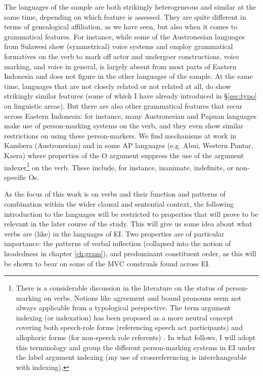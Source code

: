 The languages of the sample are both strikingly heterogeneous and similar at the same time, depending on which feature is assessed. They are quite different in terms of genealogical affiliation, as we have seen, but also when it comes to grammatical features. For instance, while some of the Austronesian languages from Sulawesi show (symmetrical) voice systems and employ grammatical formatives on the verb to mark off actor and undergoer constructions, voice marking, and voice in general, is largely absent from most parts of Eastern Indonesia and does not figure in the other languages of the sample. At the same time, languages that are not closely related or not related at all, do show strikingly similar features (some of which I have already introduced in §\ref{sec:typo} on linguistic areas). But there are also other grammatical features that recur across Eastern Indonesia: for instance, many Austronesian and Papuan languages make use of person-marking systems on the verb, and they even show similar restrictions on using these person-markers. We find mechanisms at work in Kambera (Austronesian) and in some AP languages (e.g. Abui, Western Pantar, Kaera) where properties of the O argument suppress the use of the argument indexer\footnote{There is a considerable discussion in the literature on the status of person-marking on verbs. Notions like agreement and bound pronouns seem not always applicable from a typological perspective. The term argument indexing (or indexation) has been proposed as a more neutral concept covering both speech-role forms (referencing speech act participants) and allophoric forms (for non-speech role referents) \parencite{haspelmath2013argument}. In what follows, I will adopt this terminology and group the different person-marking systems in EI under the label argument indexing (my use of crossreferencing is interchangeable with indexing).} on the verb. These include, for instance, inanimate, indefinite, or non-specific Os. 

As the focus of this work is on verbs and their function and patterns of combination within the wider clausal and sentential context, the following introduction to the languages will be restricted to properties that will prove to be relevant in the later course of the study. This will give us some idea about what verbs are (like) in the languages of EI. Two properties are of particular importance: the patterns of verbal inflection (collapsed into the notion of headedness in chapter \ref{ch:gram}), and predominant constituent order, as this will be shown to bear on some of the MVC construals found across EI.

